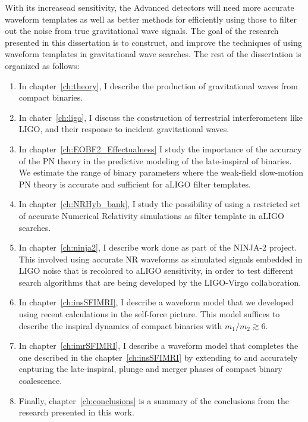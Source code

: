 With its increasead sensitivity, the Advanced detectors will need more accurate
waveform templates as well as better methods for efficiently using those to 
filter out the noise from true gravitational wave signals. 
The goal of the research presented in this dissertation is to construct, and
improve the techniques of using waveform templates in gravitational wave searches. 
The rest of the dissertation is organized as follows:
\begin{enumerate}
 \item In chapter~\ref{ch:theory}, I describe the production of gravitational
 waves from compact binaries. %
 \item In chater~\ref{ch:ligo}, I discuss the construction of terrestrial 
 interferometers like LIGO, and their response to incident gravitational waves.
 \item In chapter~\ref{ch:EOBF2_Effectualness} 
 I study the importance of the accuracy of the PN theory in the predictive 
 modeling of the late-inspiral of binaries. We estimate the range of binary 
 parameters where the weak-field slow-motion PN theory is accurate and 
 sufficient for aLIGO filter templates.
 \item In chapter~\ref{ch:NRHyb_bank}, I study the possibility of using a
 restricted set of accurate Numerical Relativity simulations as filter template
 in aLIGO searches. 
 \item In chapter~\ref{ch:ninja2}, I describe work done as part of the 
 NINJA-2 project. This involved using accurate NR waveforms as simulated
 signals embedded in LIGO noise that is recolored to aLIGO sensitivity, in
 order to test different search algorithms that are being developed by the
 LIGO-Virgo collaboration.
 \item In chapter~\ref{ch:insSFIMRI}, I describe a waveform model that we 
 developed using recent calculations in the self-force picture. This model 
 suffices to describe the inspiral dynamics of compact binaries with 
 $m_1/m_2\gtrsim 6$.
 \item In chapter~\ref{ch:imrSFIMRI}, I describe a waveform model that 
 completes the one described in the chapter~\ref{ch:insSFIMRI} by extending to 
 and accurately capturing the late-inspiral, plunge and merger phases of 
 compact binary coalescence. 
 \item Finally, chapter~\ref{ch:conclusions} is a summary of the conclusions
 from the research presented in this work.
\end{enumerate}




